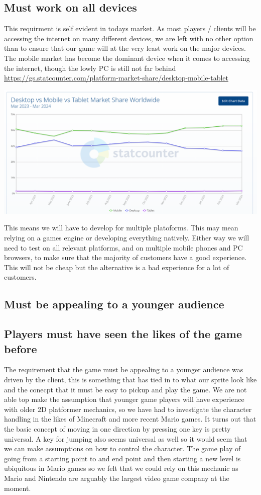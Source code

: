 \documentclass{article}
\begin{document}
\subsection{ Must work on all devices }
This requirment is self evident in todays market. As most players / clients will be accessing the internet on many different devices, we are left with no other option than to ensure that our game will at the very least work on the major devices.
The mobile market has become the dominant device when it comes to accessing the internet, though the lowly PC is still not far behind \url{https://gs.statcounter.com/platform-market-share/desktop-mobile-tablet}

\includegraphics[scale=0.35]{MobileVsPC}

This means we will have to develop for multiple platoforms. This may mean relying on a games engine or developing everything natively. Either way we will need to test on all relevant platforms, and on multiple mobile phones and PC browsers, to make sure that the majority of customers have a good experience. This will not be cheap but the alternative is a bad experience for a lot of customers.

\subsection{ Must be appealing to a younger audience }
\subsection{ Players must have seen the likes of the game before }
The requirement that the game must be appealing to a younger audience was driven by the client, this is something that has tied in to what our sprite look like and the conecpt that it must be easy to pickup and play the game.
We are not able top make the assumption that younger game players will have experience with older 2D platformer mechanics, so we have had to investigate the character handling in the likes of Minecraft and more recent Mario games. It turns out that the basic concept of moving in one direction by pressing one key is pretty universal. A key for jumping also seems universal as well so it would seem that we can make assumptions on how to control the character.
The game play of going from a starting point to and end point and then starting a new level is ubiquitous in Mario games so we felt that we could rely on this mechanic as Mario and Nintendo are arguably the largest video game company at the moment.
\end{document}
